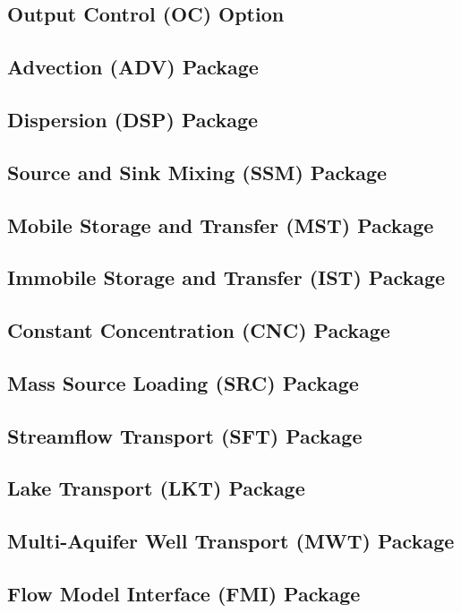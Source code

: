 \newpage
\subsection{Output Control (OC) Option}


\newpage
\subsection{Advection (ADV) Package}


\newpage
\subsection{Dispersion (DSP) Package}


\newpage
\subsection{Source and Sink Mixing (SSM) Package}


\newpage
\subsection{Mobile Storage and Transfer (MST) Package}


\newpage
\subsection{Immobile Storage and Transfer (IST) Package}


\newpage
\subsection{Constant Concentration (CNC) Package}


\newpage
\subsection{Mass Source Loading (SRC) Package}


\newpage
\subsection{Streamflow Transport (SFT) Package}


\newpage
\subsection{Lake Transport (LKT) Package}


\newpage
\subsection{Multi-Aquifer Well Transport (MWT) Package}


\newpage
\subsection{Flow Model Interface (FMI) Package}


%

